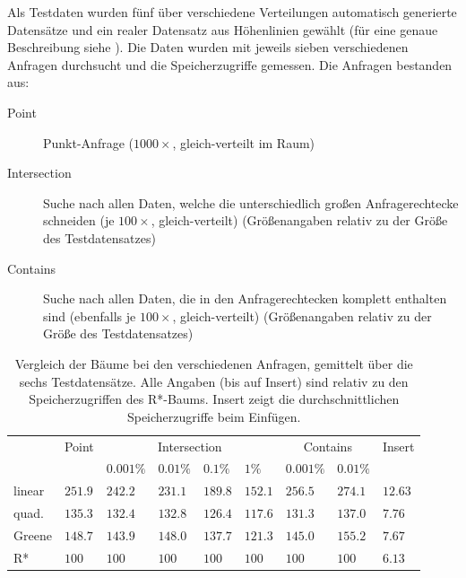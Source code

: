 \documentclass[runningheads,a4paper]{llncs}
\begin{document}
	Als Testdaten wurden fünf über verschiedene Verteilungen automatisch generierte Datensätze und ein realer Datensatz aus Höhenlinien gewählt (für eine genaue Beschreibung siehe \cite[328]{Beckmann:1990}). Die Daten wurden mit jeweils sieben verschiedenen Anfragen durchsucht und die Speicherzugriffe gemessen. Die Anfragen bestanden aus:
	\begin{description}
		\item[Point] Punkt-Anfrage ($1000\times$, gleich-verteilt im Raum)
		\item[Intersection] Suche nach allen Daten, welche die unterschiedlich großen Anfragerechtecke schneiden (je $100\times$, gleich-verteilt) (Größenangaben relativ zu der Größe des Testdatensatzes)
		\item[Contains] Suche nach allen Daten, die in den Anfragerechtecken komplett enthalten sind (ebenfalls je $100\times$, gleich-verteilt) (Größenangaben relativ zu der Größe des Testdatensatzes)
	\end{description}

	\begin{table}
	\caption{Vergleich der Bäume bei den verschiedenen Anfragen, gemittelt über die sechs Testdatensätze. Alle Angaben (bis auf Insert) sind relativ zu den Speicherzugriffen des R*-Baums. Insert zeigt die durchschnittlichen Speicherzugriffe beim Einfügen.}
	\label{tab:benchmark-queries}
	\begin{tabularx}{\textwidth}{l|X|X|X|X|X|X|X|X}
		& Point & \multicolumn{4}{c|}{Intersection} & \multicolumn{2}{c|}{Contains} & Insert \\
		& & $0.001\%$ & $0.01\%$ & $0.1\%$ & $1\%$ & $0.001\%$ & $0.01\%$ & \\
		\hline \hline
		linear	& $251.9$ & $242.2$ & $231.1$ & $189.8$ & $152.1$ & $256.5$ & $274.1$ & $12.63$	\\ \hline
		quad.		&	$135.3$ & $132.4$ & $132.8$ & $126.4$ & $117.6$ & $131.3$ & $137.0$ & $7.76$	\\ \hline
		Greene	& $148.7$ & $143.9$ & $148.0$ & $137.7$ & $121.3$ & $145.0$ & $155.2$ & $7.67$	\\ \hline
		R*			& $100$		& $100$		& $100$		& $100$		& $100$		& $100$		& $100$		& $6.13$
	\end{tabularx}
	\end{table}
\end{document}
